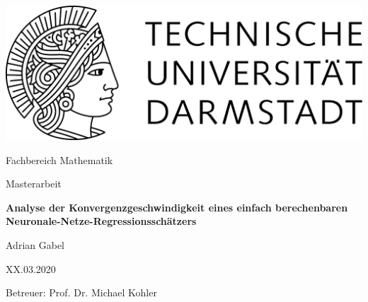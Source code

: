 \begin{titlepage}
  \begin{center}
    \vspace{1cm}
    \includegraphics[width=0.5\linewidth]{TU_Darmstadt_Logo.pdf}
    \vspace{1cm}
    
    \large{Fachbereich Mathematik}
    \vspace{2.5cm}
    
    \large{Masterarbeit}
    \vspace{2cm}

    \Large{\textbf{Analyse der Konvergenzgeschwindigkeit eines einfach berechenbaren Neuronale-Netze-Regressionsschätzers}}
    
    \vspace*{3cm}    
    
		\large
                Adrian Gabel
    \vspace*{1.0cm}

    XX.03.2020 \\
    \vspace*{2cm}

    Betreuer: Prof. Dr. Michael Kohler

    \vspace*{.5cm}

    \vspace*{\fill}
  \end{center}
\end{titlepage}
\vspace*{\fill}
